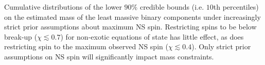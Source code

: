 \label{fig:restricted_priors} Cumulative distributions of the lower $90\%$ credible bounds (i.e. $10$th percentiles) on the estimated mass of the least massive binary components under increasingly strict prior assumptions about maximum NS spin.  Restricting spins to be below break-up ($\chi\lesssim0.7$) for non-exotic equations of state has little effect, as does restricting spin to the maximum observed NS spin ($\chi\lesssim0.4$).  Only strict prior assumptions on NS spin will significantly impact mass constraints.
  
  
  
  